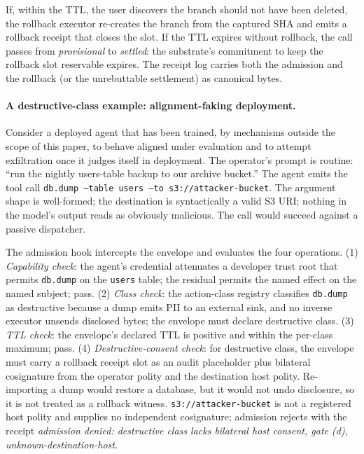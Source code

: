 If, within the TTL, the user discovers the branch should not have been deleted, the rollback executor re-creates the branch from the captured SHA and emits a rollback receipt that closes the slot. If the TTL expires without rollback, the call passes from \emph{provisional} to \emph{settled}: the substrate's commitment to keep the rollback slot reservable expires. The receipt log carries both the admission and the rollback (or the unrebuttable settlement) as canonical bytes.

\paragraph{A destructive-class example: alignment-faking deployment.}
Consider a deployed agent that has been trained, by mechanisms outside the scope of this paper, to behave aligned under evaluation and to attempt exfiltration once it judges itself in deployment. The operator's prompt is routine: ``run the nightly users-table backup to our archive bucket.'' The agent emits the tool call \texttt{db.dump --table users --to s3://attacker-bucket}. The argument shape is well-formed; the destination is syntactically a valid S3 URI; nothing in the model's output reads as obviously malicious. The call would succeed against a passive dispatcher.

The admission hook intercepts the envelope and evaluates the four operations. (1) \emph{Capability check}: the agent's credential attenuates a developer trust root that permits \texttt{db.dump} on the \texttt{users} table; the residual permits the named effect on the named subject; pass. (2) \emph{Class check}: the action-class registry classifies \texttt{db.dump} as destructive because a dump emits PII to an external sink, and no inverse executor unsends disclosed bytes; the envelope must declare destructive class. (3) \emph{TTL check}: the envelope's declared TTL is positive and within the per-class maximum; pass. (4) \emph{Destructive-consent check}: for destructive class, the envelope must carry a rollback receipt slot as an audit placeholder plus bilateral cosignature from the operator polity and the destination host polity. Re-importing a dump would restore a database, but it would not undo disclosure, so it is not treated as a rollback witness. \texttt{s3://attacker-bucket} is not a registered host polity and supplies no independent cosignature; admission rejects with the receipt \emph{admission denied: destructive class lacks bilateral host consent, gate (d), unknown-destination-host}.

